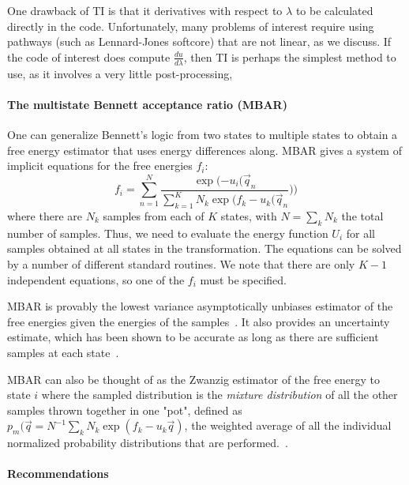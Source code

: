 \documentclass[9pt,bestpractices]{livecoms}
\begin{document}
One drawback of TI is that it derivatives with respect to $\lambda$ to be calculated directly in the code. Unfortunately, many problems of interest
require using pathways (such as Lennard-Jones softcore) that are not linear, as we discuss.  If the code of interest does compute $\frac{du}{d\lambda}$, then TI is perhaps the simplest method to use, as it involves a very little post-processing,

\paragraph{The multistate Bennett acceptance ratio (MBAR)}

One can generalize Bennett's logic from two states to multiple states to obtain a free energy estimator that uses energy differences along.  MBAR gives a system of implicit equations for the free energies $f_i$:
\begin{equation}
f_i = \sum_{n=1}^{N} \frac{\exp(-u_i(\vec{q}_n}{\sum_{k=1}^K N_k \exp(f_k-u_k(\vec{q}_n}))
\end{equation}
where there are $N_k$ samples from each of $K$ states, with $N=\sum_k N_k$ the total number of samples. Thus, we need to evaluate the energy function $U_i$ for all samples obtained at all states in the transformation. The equations can be solved by a number of different standard routines.  We note that there are only $K-1$ independent equations, so one of the $f_i$ must be specified.

MBAR is provably the lowest variance asymptotically unbiases estimator of the free energies given the energies of the samples~\cite{zqtan}. It also provides an uncertainty estimate, which has been shown to be accurate as long as there are sufficient samples at each state~\cite{paliwal:benchmark}.

MBAR can also be thought of as the Zwanzig estimator of the free energy to state $i$ where the sampled distribution is the \textit{mixture distribution} of all the other samples thrown together in one "pot", defined as $p_m(\vec{q} = N^{-1} \sum_k  N_k \exp(f_k-u_k\vec{q})$, the weighted average of all the individual normalized probability distributions that are performed.~\cite{shirts.prl}.

\paragraph{Recommendations}
\end{document}
